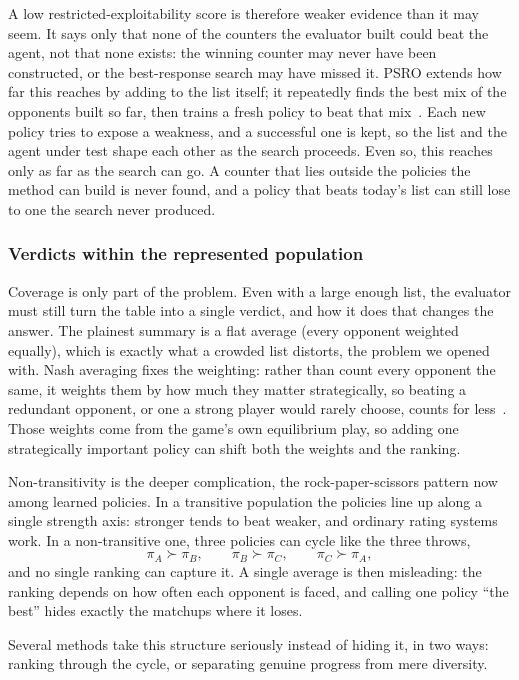 A low restricted-exploitability score is therefore weaker evidence than it may seem.
It says only that none of the counters the evaluator built could beat the agent, not
that none exists: the winning counter may never have been constructed, or the
best-response search may have missed it. PSRO extends how far this reaches by adding to the list itself; it repeatedly finds the best mix of the
opponents built so far, then
trains a fresh policy to beat that mix~\citep{Lanctot2017}. Each new policy tries to
expose a weakness, and a successful one is kept, so the list and the agent under
test shape each other as the search proceeds. Even so, this reaches only as far as the search can go. A counter that lies
outside the policies the method can build is never found, and a policy that
beats today's list can still lose to one the search never produced.

\subsubsection{Verdicts within the represented population}
Coverage is only part of the problem. Even with a large enough list, the evaluator
must still turn the table into a single verdict, and how it does that changes the
answer. The plainest summary is a flat average (every opponent weighted equally),
which is exactly what a crowded list distorts, the problem we opened with. Nash
averaging fixes the weighting: rather than count every opponent the same, it weights
them by how much they matter strategically, so beating a redundant opponent, or one a
strong player would rarely choose, counts for less~\citep{Balduzzi2018}. Those weights
come from the game's own equilibrium play, so adding one strategically important
policy can shift both the weights and the ranking.

Non-transitivity is the deeper complication, the rock-paper-scissors pattern
now among learned policies. In a transitive population the policies line up along a single strength axis: stronger tends to beat
weaker, and ordinary rating systems work. In a non-transitive one, three policies can cycle like the three
throws,
\[
\pi_A \succ \pi_B,\qquad
\pi_B \succ \pi_C,\qquad
\pi_C \succ \pi_A,
\]
and no single ranking can capture it. A single average is then misleading: the
ranking depends on how often each opponent is faced, and calling one policy ``the
best'' hides exactly the matchups where it loses.

Several methods take this structure seriously instead of hiding it, in two ways:
ranking through the cycle, or separating genuine progress from mere diversity.

